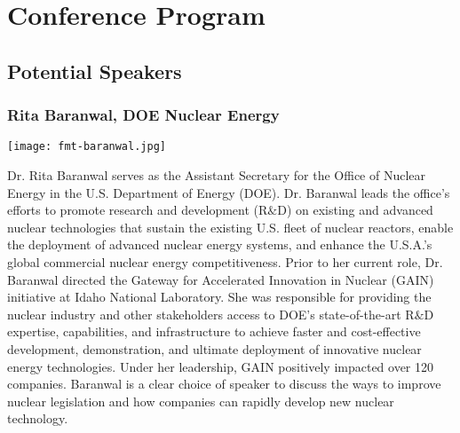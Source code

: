  \section{Conference Program}

\subsection{Potential Speakers}

\subsubsection{Rita Baranwal, DOE Nuclear Energy}

\begin{minipage}{0.25\textwidth}
	\centering
	\texttt{[image: fmt-baranwal.jpg]}
\end{minipage}
\begin{minipage}{0.73\textwidth}
	Dr. Rita Baranwal serves as the Assistant Secretary for the Office of Nuclear Energy in the U.S. Department of Energy (DOE).  Dr. Baranwal leads the office’s efforts to promote research and development (R$\&$D) on existing and advanced nuclear technologies that sustain the existing U.S. fleet of nuclear reactors, enable the deployment of advanced nuclear energy systems, and enhance the U.S.A.'s global commercial nuclear energy competitiveness. Prior to her current role, Dr. Baranwal directed the Gateway for Accelerated Innovation in Nuclear (GAIN) initiative at Idaho National Laboratory.  She was responsible for providing the nuclear industry and other stakeholders access to DOE's state-of-the-art R$\&$D expertise, capabilities, and infrastructure to achieve faster and cost-effective development, demonstration, and ultimate deployment of innovative nuclear energy technologies. Under her leadership, GAIN positively impacted over 120 companies. Baranwal is a clear choice of speaker to discuss the ways to improve nuclear legislation and how companies can rapidly develop new nuclear technology.
\end{minipage}

